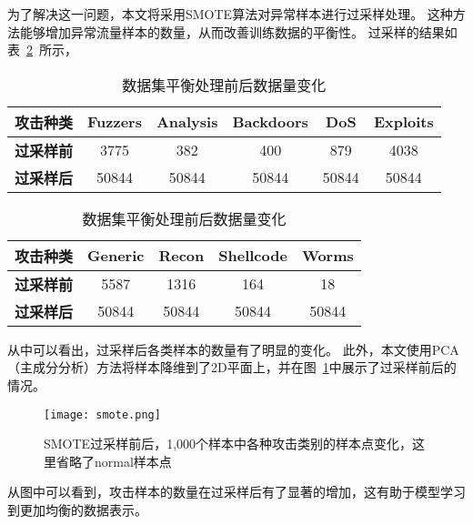 为了解决这一问题，本文将采用SMOTE算法对异常样本进行过采样处理。
这种方法能够增加异常流量样本的数量，从而改善训练数据的平衡性。
过采样的结果如表~\ref{tab:attack_num_transposed_part1}~所示，
\begin{table}[h]
	\centering
	\caption{数据集平衡处理前后数据量变化}
	\label{tab:attack_num_transposed_part1}
	\begin{tabular}{cccccc}
		\toprule
		攻击种类          & \textbf{Fuzzers} & \textbf{Analysis} & \textbf{Backdoors} & \textbf{DoS} & \textbf{Exploits} \\
		\midrule
		\textbf{过采样前} & 3775             & 382               & 400                & 879          & 4038              \\
		\textbf{过采样后} & 50844            & 50844             & 50844              & 50844        & 50844             \\
		\bottomrule
	\end{tabular}
	\begin{tabular}{ccccc}
		\toprule
		攻击种类          & \textbf{Generic} & \textbf{Recon} & \textbf{Shellcode} & \textbf{Worms} \\
		\midrule
		\textbf{过采样前} & 5587             & 1316           & 164                & 18             \\
		\textbf{过采样后} & 50844            & 50844          & 50844              & 50844          \\
		\bottomrule
	\end{tabular}
\end{table}
从中可以看出，过采样后各类样本的数量有了明显的变化。
此外，本文使用PCA（主成分分析）方法将样本降维到了2D平面上，并在图~\ref{fig:prepostsmote}中展示了过采样前后的情况。
\begin{figure}[htbp]
	\centering
	\texttt{[image: smote.png]}
	\caption{SMOTE过采样前后，1,000个样本中各种攻击类别的样本点变化，这里省略了normal样本点}
	\label{fig:prepostsmote}
\end{figure}
从图中可以看到，攻击样本的数量在过采样后有了显著的增加，这有助于模型学习到更加均衡的数据表示。\par

